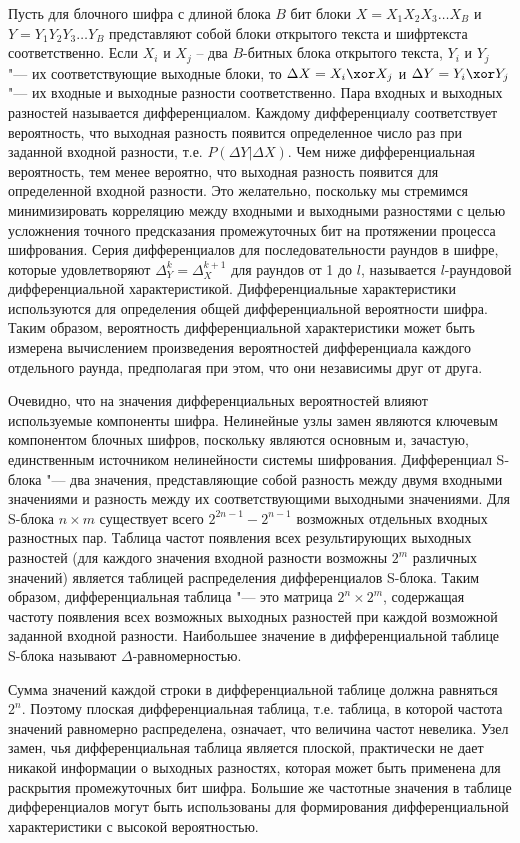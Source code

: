 Пусть для блочного шифра с длиной блока $B$ бит блоки $X = X_1 X_2 X_3 \ldots
X_B$ и $Y = Y_1 Y_2 Y_3 \ldots Y_B$ представляют собой блоки открытого текста и
шифртекста соответственно. Если $X_i$ и $X_j$ – два $B$-битных блока открытого
текста, $Y_i$ и $Y_j$ "--- их соответствующие выходные блоки, то $\Delta X = X_i
\xor X_j$ и $\Delta Y = Y_i \xor Y_j$ "--- их входные и выходные разности
соответственно. Пара входных и выходных разностей называется дифференциалом.
Каждому дифференциалу соответствует вероятность, что выходная разность появится
определенное число раз при заданной входной разности, т.е. $P(\Delta Y | \Delta
X)$. Чем ниже дифференциальная вероятность, тем менее вероятно, что выходная
разность появится для определенной входной разности. Это желательно, поскольку
мы стремимся минимизировать корреляцию между входными и выходными разностями с
целью усложнения точного предсказания промежуточных бит на протяжении процесса
шифрования. Серия дифференциалов для последовательности раундов в шифре, которые
удовлетворяют $\Delta^k_Y = \Delta^{k+1}_X$ для раундов от 1 до $l$, называется
$l$-раундовой дифференциальной характеристикой. Дифференциальные характеристики
используются для определения общей дифференциальной вероятности шифра. Таким
образом, вероятность дифференциальной характеристики может быть измерена
вычислением произведения вероятностей дифференциала каждого отдельного раунда,
предполагая при этом, что они независимы друг от друга.

Очевидно, что на значения дифференциальных вероятностей влияют используемые
компоненты шифра. Нелинейные узлы замен являются ключевым компонентом блочных
шифров, поскольку являются основным и, зачастую, единственным источником
нелинейности системы шифрования. Дифференциал S-блока "--- два значения,
представляющие собой разность между двумя входными значениями и разность между
их соответствующими выходными значениями. Для S-блока $n \times m$ существует
всего $2^{2n-1} - 2^{n-1}$ возможных отдельных входных разностных пар. Таблица
частот появления всех результирующих выходных разностей (для каждого значения
входной разности возможны $2^m$ различных значений) является таблицей
распределения дифференциалов S-блока. Таким образом, дифференциальная таблица
"--- это матрица $2^n \times 2^m$, содержащая частоту появления всех возможных
выходных разностей при каждой возможной заданной входной разности. Наибольшее
значение в дифференциальной таблице S-блока называют $\Delta$-равномерностью.

Сумма значений каждой строки в дифференциальной таблице должна равняться $2^n$.
Поэтому плоская дифференциальная таблица, т.е. таблица, в которой частота
значений равномерно распределена, означает, что величина частот невелика. Узел
замен, чья дифференциальная таблица является плоской, практически не дает
никакой информации о выходных разностях, которая может быть применена для
раскрытия промежуточных бит шифра. Большие же частотные значения в таблице
дифференциалов могут быть использованы для формирования дифференциальной
характеристики с высокой вероятностью.

